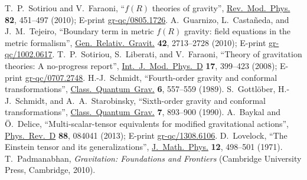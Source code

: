 \documentclass[a4paper,showkeys,aps,prd,reprint,nofootinbib,showpacs,twocolumn]{revtex4-1}
\theoremstyle{plain}
\begin{document}
{\begin{thebibliography}{99}
  T.~P.~Sotiriou and V.~Faraoni,
  ``$f(R)$ theories of gravity'', 
  \href{http://rmp.aps.org/abstract/RMP/v82/i1/p451_1}{Rev.~Mod.~Phys.}  {\bf 82}, 451--497 (2010); 
  E-print \href{http://arxiv.org/abs/0805.1726}{gr-qc/0805.1726}.
  A.~Guarnizo, L.~Casta\~{n}eda, and J.~M.~Tejeiro,
  ``Boundary term in metric $f(R)$ gravity: field equations in the metric formalism'', 
  \href{http://link.springer.com/article/10.1007%
  2Fs10714-010-1012-6}{Gen.\ Relativ.\ Gravit.} {\bf 42}, 2713--2728 (2010);
  E-print \href{http://arxiv.org/abs/arXiv:1002.0617}{gr-qc/1002.0617}.
  T.~P.~Sotiriou, S.~Liberati, and V.~Faraoni,
  ``Theory of gravitation theories: A no-progress report'', 
  \href{http://www.worldscientific.com/doi/abs/10.1142/S0218271808012097}{Int.~J.~Mod.~Phys.~D} {\bf 17}, 399--423 (2008); 
  E-print \href{http://arxiv.org/abs/0707.2748}{gr-qc/0707.2748}.
  H.-J.~Schmidt,
  ``Fourth-order gravity and conformal transformations'', 
  \href{http://iopscience.iop.org/0264-9381/6/4/013/}{Class.~Quantum~Grav.}  {\bf 6}, 557--559 (1989).
  S.~Gottl\"ober, H.-J.~Schmidt, and A.~A.~Starobinsky,
  ``Sixth-order gravity and conformal transformations'', 
  \href{http://iopscience.iop.org/0264-9381/7/5/018/}{Class.~Quantum~Grav.}  {\bf 7}, 893--900 (1990).
  A.~Baykal and {\"O}.~Delice,
  ``Multi-scalar-tensor equivalents for modified gravitational actions'',
  \href{http://prd.aps.org/abstract/PRD/v88/i8/e084041}{Phys.\ Rev.\ D} {\bf 88}, 084041 (2013);
  E-print \href{http://arxiv.org/abs/arXiv:1308.6106}{gr-qc/1308.6106}.
  D.~Lovelock,
  ``The Einstein tensor and its generalizations'', 
  \href{http://scitation.aip.org/content/aip/journal/jmp/12/3/10.1063/1.1665613}{J.\ Math.\ Phys.} {\bf 12}, 498--501 (1971).
  T.~Padmanabhan,
  {\em Gravitation: Foundations and Frontiers\/} 
  (Cambridge University Press, Cambridge, 2010).

\end{thebibliography}}
\end{document}
